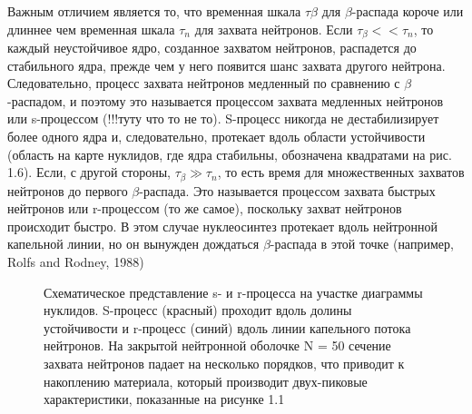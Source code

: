 \documentclass[%
bachelor,    %
natbib,      %
subf,        %
href,        %
colorlinks,  %
]{disser}
\begin{document}
Важным отличием является то, что временная шкала $\tau\beta$ для $\beta$-распада короче или длиннее чем временная шкала $\tau_n$ для захвата нейтронов. Если $\tau_\beta << \tau_n$, то каждый неустойчивое ядро, созданное захватом нейтронов, распадется до стабильного ядра, прежде чем у него появится шанс захвата другого нейтрона. Следовательно, процесс захвата нейтронов медленный по сравнению с $\beta$-распадом, и поэтому это называется процессом захвата медленных нейтронов или s-процессом (!!!туту что то не то). S-процесс никогда не дестабилизирует более одного ядра и, следовательно, протекает вдоль области устойчивости (область на карте нуклидов, где ядра стабильны, обозначена квадратами на рис. 1.6). Если, с другой стороны, $\tau_\beta \gg \tau_n$, то есть время для множественных захватов нейтронов до первого $\beta$-распада. Это называется процессом захвата быстрых нейтронов или r-процессом (то же самое), поскольку захват нейтронов происходит быстро. В этом случае нуклеосинтез протекает вдоль нейтронной капельной линии, но он вынужден дождаться $\beta$-распада в этой точке (например, Rolfs and Rodney, 1988)

\begin{figure}[h]
	\caption{Схематическое представление s- и r-процесса на участке диаграммы нуклидов. S-процесс (красный) проходит вдоль долины устойчивости и r-процесс (синий) вдоль линии капельного потока нейтронов. На закрытой нейтронной оболочке N = 50 сечение захвата нейтронов падает на несколько порядков, что приводит к накоплению материала, который производит двух-пиковые характеристики, показанные на рисунке 1.1}
	\label{ris:6}
\end{figure}
\end{document}
